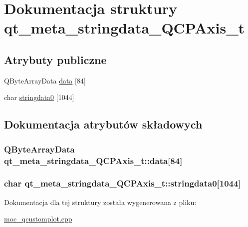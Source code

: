 \hypertarget{structqt__meta__stringdata___q_c_p_axis__t}{}\section{Dokumentacja struktury qt\+\_\+meta\+\_\+stringdata\+\_\+\+Q\+C\+P\+Axis\+\_\+t}
\label{structqt__meta__stringdata___q_c_p_axis__t}
\subsection*{Atrybuty publiczne}
\begin{DoxyCompactItemize}
\item 
Q\+Byte\+Array\+Data \hyperlink{structqt__meta__stringdata___q_c_p_axis__t_ad6e7d43321d1d29667d8a964e8b94b03}{data} \mbox{[}84\mbox{]}
\item 
char \hyperlink{structqt__meta__stringdata___q_c_p_axis__t_a69e367a936d5d819080b35c76fe96c11}{stringdata0} \mbox{[}1044\mbox{]}
\end{DoxyCompactItemize}


\subsection{Dokumentacja atrybutów składowych}
\subsubsection[{\texorpdfstring{data}{data}}]{\setlength{\rightskip}{0pt plus 5cm}Q\+Byte\+Array\+Data qt\+\_\+meta\+\_\+stringdata\+\_\+\+Q\+C\+P\+Axis\+\_\+t\+::data\mbox{[}84\mbox{]}}\hypertarget{structqt__meta__stringdata___q_c_p_axis__t_ad6e7d43321d1d29667d8a964e8b94b03}{}\label{structqt__meta__stringdata___q_c_p_axis__t_ad6e7d43321d1d29667d8a964e8b94b03}
\subsubsection[{\texorpdfstring{stringdata0}{stringdata0}}]{\setlength{\rightskip}{0pt plus 5cm}char qt\+\_\+meta\+\_\+stringdata\+\_\+\+Q\+C\+P\+Axis\+\_\+t\+::stringdata0\mbox{[}1044\mbox{]}}\hypertarget{structqt__meta__stringdata___q_c_p_axis__t_a69e367a936d5d819080b35c76fe96c11}{}\label{structqt__meta__stringdata___q_c_p_axis__t_a69e367a936d5d819080b35c76fe96c11}


Dokumentacja dla tej struktury została wygenerowana z pliku\+:\begin{DoxyCompactItemize}
\item 
\hyperlink{moc__qcustomplot_8cpp}{moc\+\_\+qcustomplot.\+cpp}\end{DoxyCompactItemize}
